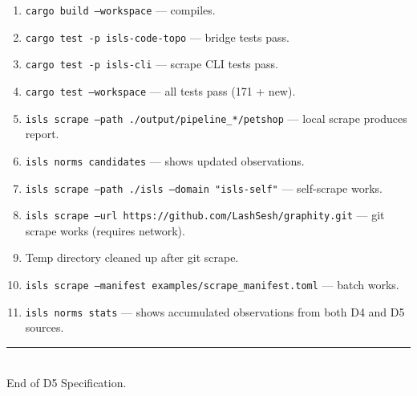\documentclass[11pt,a4paper]{article}
\begin{document}
\begin{enumerate}
\item \texttt{cargo build --workspace} --- compiles.
\item \texttt{cargo test -p isls-code-topo} --- bridge tests pass.
\item \texttt{cargo test -p isls-cli} --- scrape CLI tests pass.
\item \texttt{cargo test --workspace} --- all tests pass (171 + new).
\item \texttt{isls scrape --path ./output/pipeline\_*/petshop}
      --- local scrape produces report.
\item \texttt{isls norms candidates} --- shows updated observations.
\item \texttt{isls scrape --path ./isls --domain "isls-self"}
      --- self-scrape works.
\item \texttt{isls scrape --url https://github.com/LashSesh/graphity.git}
      --- git scrape works (requires network).
\item Temp directory cleaned up after git scrape.
\item \texttt{isls scrape --manifest examples/scrape\_manifest.toml}
      --- batch works.
\item \texttt{isls norms stats} --- shows accumulated observations
      from both D4 and D5 sources.
\end{enumerate}

\vfill
\begin{center}
\color{isls-gray}\rule{0.5\textwidth}{0.4pt}\\[0.5em]
{\small End of D5 Specification.}
\end{center}
\end{document}
